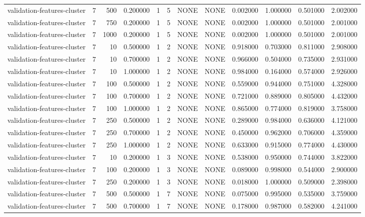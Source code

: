 \begin{tabular}{lrrrllllrrrr}
validation-features-cluster & 7 & 500 & 0.200000 & 1 & 5 & NONE & NONE & 0.002000 & 1.000000 & 0.501000 & 2.002000 \\
validation-features-cluster & 7 & 750 & 0.200000 & 1 & 5 & NONE & NONE & 0.002000 & 1.000000 & 0.501000 & 2.001000 \\
validation-features-cluster & 7 & 1000 & 0.200000 & 1 & 5 & NONE & NONE & 0.002000 & 1.000000 & 0.501000 & 2.001000 \\
validation-features-cluster & 7 & 10 & 0.500000 & 1 & 2 & NONE & NONE & 0.918000 & 0.703000 & 0.811000 & 2.908000 \\
validation-features-cluster & 7 & 10 & 0.700000 & 1 & 2 & NONE & NONE & 0.966000 & 0.504000 & 0.735000 & 2.931000 \\
validation-features-cluster & 7 & 10 & 1.000000 & 1 & 2 & NONE & NONE & 0.984000 & 0.164000 & 0.574000 & 2.926000 \\
validation-features-cluster & 7 & 100 & 0.500000 & 1 & 2 & NONE & NONE & 0.559000 & 0.944000 & 0.751000 & 4.328000 \\
validation-features-cluster & 7 & 100 & 0.700000 & 1 & 2 & NONE & NONE & 0.721000 & 0.889000 & 0.805000 & 4.432000 \\
validation-features-cluster & 7 & 100 & 1.000000 & 1 & 2 & NONE & NONE & 0.865000 & 0.774000 & 0.819000 & 3.758000 \\
validation-features-cluster & 7 & 250 & 0.500000 & 1 & 2 & NONE & NONE & 0.289000 & 0.984000 & 0.636000 & 4.121000 \\
validation-features-cluster & 7 & 250 & 0.700000 & 1 & 2 & NONE & NONE & 0.450000 & 0.962000 & 0.706000 & 4.359000 \\
validation-features-cluster & 7 & 250 & 1.000000 & 1 & 2 & NONE & NONE & 0.633000 & 0.915000 & 0.774000 & 4.430000 \\
validation-features-cluster & 7 & 10 & 0.200000 & 1 & 3 & NONE & NONE & 0.538000 & 0.950000 & 0.744000 & 3.822000 \\
validation-features-cluster & 7 & 100 & 0.200000 & 1 & 3 & NONE & NONE & 0.089000 & 0.998000 & 0.544000 & 2.900000 \\
validation-features-cluster & 7 & 250 & 0.200000 & 1 & 3 & NONE & NONE & 0.018000 & 1.000000 & 0.509000 & 2.398000 \\
validation-features-cluster & 7 & 500 & 0.500000 & 1 & 7 & NONE & NONE & 0.075000 & 0.995000 & 0.535000 & 3.759000 \\
validation-features-cluster & 7 & 500 & 0.700000 & 1 & 7 & NONE & NONE & 0.178000 & 0.987000 & 0.582000 & 4.241000 \\

\end{tabular}
